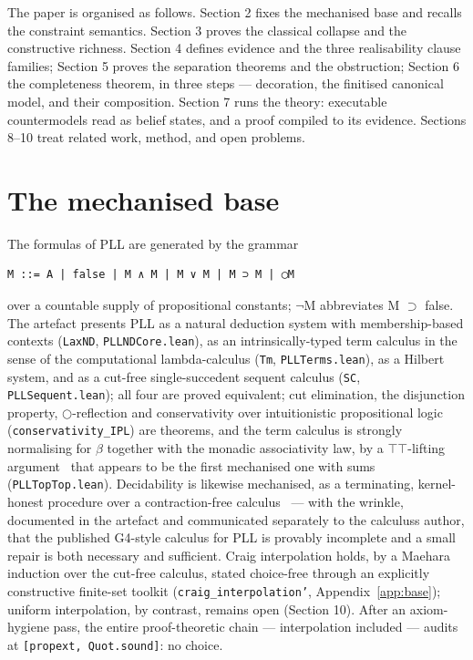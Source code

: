 The paper is organised as follows. Section 2 fixes the mechanised base
and recalls the constraint semantics. Section 3 proves the classical
collapse and the constructive richness. Section 4 defines evidence and
the three realisability clause families; Section 5 proves the
separation theorems and the obstruction; Section 6 the completeness
theorem, in three steps --- decoration, the finitised canonical model,
and their composition. Section 7 runs the theory: executable
countermodels read as belief states, and a proof compiled to its
evidence. Sections 8--10 treat related work, method, and open problems.

\section{The mechanised base}\label{2-the-mechanised-base}

The formulas of PLL are generated by the grammar

\begin{lstlisting}
M ::= A | false | M ∧ M | M ∨ M | M ⊃ M | ◯M
\end{lstlisting}

over a countable supply of propositional constants; \ensuremath{\lnot}M abbreviates
M \ensuremath{\supset} false. The artefact presents PLL as a natural deduction system with
membership-based contexts (\texttt{LaxND}, \texttt{PLLNDCore.lean}), as an
intrinsically-typed term calculus in the sense of the computational
lambda-calculus (\texttt{Tm}, \texttt{PLLTerms.lean}), as a Hilbert system, and as a
cut-free single-succedent sequent calculus (\texttt{SC}, \texttt{PLLSequent.lean});
all four are proved equivalent; cut elimination, the disjunction
property, \ensuremath{\bigcirc}-reflection and conservativity over intuitionistic
propositional logic (\texttt{conservativity\_IPL}) are theorems, and the term calculus is
strongly normalising for \ensuremath{\beta} together with the monadic associativity law,
by a \ensuremath{\top\top}-lifting argument~\cite{LindleyStark2005} that appears to be the first mechanised one
with sums (\texttt{PLLTopTop.lean}). Decidability is likewise mechanised, as a
terminating, kernel-honest procedure over a contraction-free
calculus~\cite{Dyckhoff1992,Iemhoff2024} ---
with the wrinkle, documented in the artefact and communicated
separately to the calculus\textquotesingle s author, that the published G4-style calculus for PLL
is provably incomplete and a small repair is both necessary and
sufficient. Craig interpolation holds, by a Maehara induction over the
cut-free calculus, stated choice-free through an explicitly
constructive finite-set toolkit (\texttt{craig\_interpolation'},
Appendix~\ref{app:base}); uniform interpolation, by contrast, remains
open (Section 10). After an axiom-hygiene pass, the entire
proof-theoretic chain --- interpolation included --- audits at
\texttt{[propext, Quot.sound]}: no choice.

